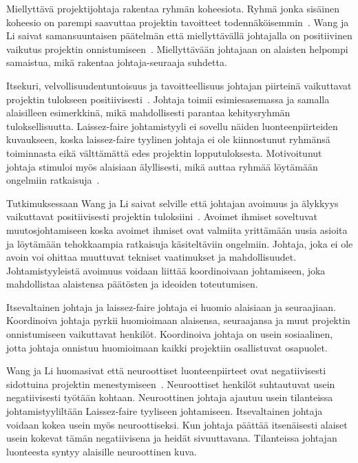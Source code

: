 \documentclass[finnish]{tktltiki2}
\theoremstyle{definition}
\theoremstyle{remark}
\begin{document}
Miellyttävä projektijohtaja rakentaa ryhmän koheesiota. Ryhmä jonka sisäinen koheesio on parempi saavuttaa projektin tavoitteet todennäköisemmin~\cite{bahli2005group}. Wang ja Li saivat samansuuntaisen päätelmän että miellyttävällä johtajalla on positiivinen vaikutus projektin onnistumiseen~\cite{Wang:2009:PMP:1639950.1640049}. Miellyttävään johtajaan on alaisten helpompi samaistua, mikä rakentaa johtaja-seuraaja suhdetta.

Itsekuri, velvollisuudentuntoisuus ja tavoitteellisuus johtajan piirteinä vaikuttavat projektin tulokseen positiivisesti~\cite{Wang:2009:PMP:1639950.1640049}. Johtaja toimii esimiesasemassa ja samalla alaisilleen esimerkkinä, mikä mahdollisesti parantaa kehitysryhmän tuloksellisuutta. Laissez-faire johtamistyyli ei sovellu näiden luonteenpiirteiden kuvaukseen, koska laissez-faire tyylinen johtaja ei ole kiinnostunut ryhmänsä toiminnasta eikä välttämättä edes projektin lopputuloksesta. Motivoitunut johtaja stimuloi myös alaisiaan älyllisesti, mikä auttaa ryhmää löytämään ongelmiin ratkaisuja~\cite{thite2000leadership}.

Tutkimuksessaan Wang ja Li saivat selville että johtajan avoimuus ja älykkyys vaikuttavat positiivisesti projektin tuloksiini~\cite{Wang:2009:PMP:1639950.1640049}. Avoimet ihmiset soveltuvat muutosjohtamiseen koska avoimet ihmiset ovat valmiita yrittämään uusia asioita ja löytämään tehokkaampia ratkaisuja käsiteltäviin ongelmiin. Johtaja, joka ei ole avoin voi ohittaa muuttuvat tekniset vaatimukset ja mahdollisuudet. Johtamistyyleistä avoimuus voidaan liittää koordinoivaan johtamiseen, joka mahdollistaa alaistensa päätösten ja ideoiden toteutumisen.

Itsevaltainen johtaja ja laissez-faire johtaja ei huomio alaisiaan ja seuraajiaan. Koordinoiva johtaja pyrkii huomioimaan alaisensa, seuraajansa ja muut projektin onnistumiseen vaikuttavat henkilöt. Koordinoiva johtaja on usein sosiaalinen, jotta johtaja onnistuu huomioimaan kaikki projektiin osallistuvat osapuolet.

Wang ja Li huomasivat että neuroottiset luonteenpiirteet ovat negatiivisesti sidottuina projektin menestymiseen~\cite{Wang:2009:PMP:1639950.1640049}. Neuroottiset henkilöt suhtautuvat usein negatiivisesti työtään kohtaan. Neuroottinen johtaja ajautuu usein tilanteissa johtamistyyliltään Laissez-faire tyyliseen johtamiseen. Itsevaltainen johtaja voidaan kokea usein myös neuroottiseksi. Kun johtaja päättää itsenäisesti alaiset usein kokevat tämän negatiivisena ja heidät sivuuttavana. Tilanteissa johtajan luonteesta syntyy alaisille neuroottinen kuva.
\end{document}
